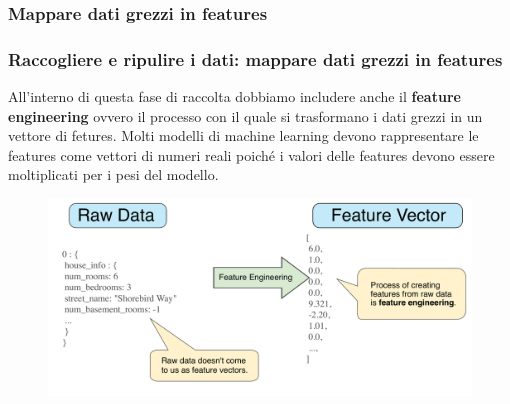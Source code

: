 \subsubsection[Mappare dati grezzi in features]{Mappare dati grezzi in features}
\begin{frame}

	\frametitle{{\color{GradientDescentDiagramBlue}Raccogliere e ripulire i dati}: mappare dati grezzi in features}

		All'interno di questa fase di raccolta dobbiamo includere anche il \textbf{feature engineering} ovvero il processo con il quale si trasformano i dati grezzi in un vettore di fetures.
		\newlinedouble
		Molti modelli di machine learning devono rappresentare le features come vettori di numeri reali poiché i valori delle features devono essere moltiplicati per i pesi del modello.

		\begin{figure}[!htbp]
			\centering
			\includegraphics[width=0.75\linewidth]{images/data_prep/feature_engineering_and_data_cleaning/RawDataToFeatureVector.pdf}
		\end{figure}

\end{frame}


